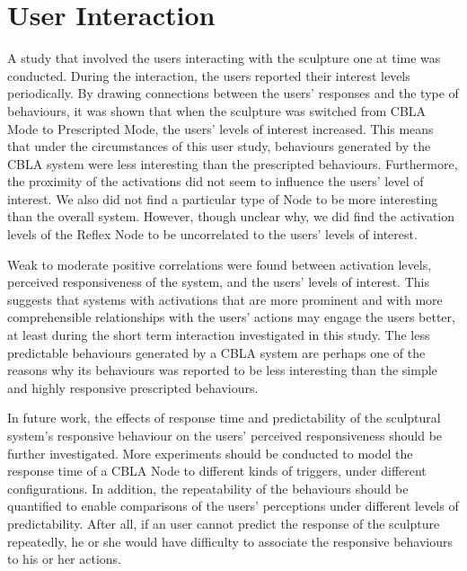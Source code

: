 \section{User Interaction}
A study that involved the users interacting with the sculpture one at time was conducted. During the interaction, the users reported their interest levels periodically. By drawing connections between the users' responses and the type of behaviours, it was shown that when the sculpture was switched from CBLA Mode to Prescripted Mode, the users' levels of interest increased. This means that under the circumstances of this user study, behaviours generated by the CBLA system were less interesting than the prescripted behaviours. 
Furthermore, the proximity of the activations did not seem to influence the users' level of interest. We also did not find a particular type of Node to be more interesting than the overall system. However, though unclear why, we did find the activation levels of the Reflex Node to be uncorrelated to the users' levels of interest. 

Weak to moderate positive correlations were found between activation levels, perceived responsiveness of the system, and the users' levels of interest. This suggests that systems with activations that are more prominent and with more comprehensible relationships with the users' actions may engage the users better, at least during the short term interaction investigated in this study. The less predictable behaviours generated by a CBLA system are perhaps one of the reasons why its behaviours was reported to be less interesting than the simple and highly responsive prescripted behaviours. 

In future work, the effects of response time and predictability of the sculptural system's responsive behaviour on the users' perceived responsiveness should be further investigated. More experiments should be conducted to model the response time of a CBLA Node to different kinds of triggers, under different configurations. In addition, the repeatability of the behaviours should be quantified to enable comparisons of the users' perceptions under different levels of predictability. After all, if an user cannot predict the response of the sculpture repeatedly, he or she would have difficulty to associate the responsive behaviours to his or her actions.

